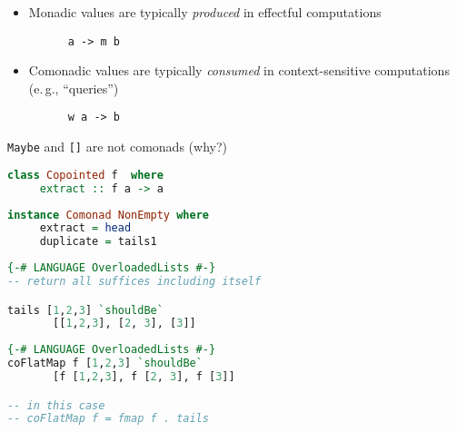 \documentclass[10pt]{beamer}
\providecommand{\eg}{e.\,g.}
\begin{document}
\begin{frame}[fragile]
  \begin{itemize}
    \item Monadic values are typically \emph{produced} in effectful computations
      \begin{verbatim}
      a -> m b 
      \end{verbatim}
    \item Comonadic values are typically \emph{consumed} in context-sensitive computations (\eg, ``queries'') 
      \begin{verbatim}
      w a -> b
      \end{verbatim}
  \end{itemize}
\end{frame}
\begin{frame}[fragile]
  \verb|Maybe| and \verb|[]| are not comonads (why?)

  \begin{lstlisting}[language=haskell, basicstyle=\ttfamily]
  class Copointed f  where 
     extract :: f a -> a 
  \end{lstlisting}
\end{frame}

\begin{frame}[fragile]
  \begin{lstlisting}[language=haskell, basicstyle=\ttfamily]
  instance Comonad NonEmpty where 
     extract = head 
     duplicate = tails1  
  \end{lstlisting}
\end{frame}


\begin{frame}[fragile]
\begin{lstlisting}[language=haskell, basicstyle=\ttfamily]
{-# LANGUAGE OverloadedLists #-}
-- return all suffices including itself

tails [1,2,3] `shouldBe`
       [[1,2,3], [2, 3], [3]]
  \end{lstlisting}
\end{frame}
    
\begin{frame}[fragile]
\begin{lstlisting}[language=haskell, basicstyle=\ttfamily]
{-# LANGUAGE OverloadedLists #-}
coFlatMap f [1,2,3] `shouldBe`
       [f [1,2,3], f [2, 3], f [3]]

-- in this case
-- coFlatMap f = fmap f . tails 
       
  \end{lstlisting}
\end{frame}
\end{document}
